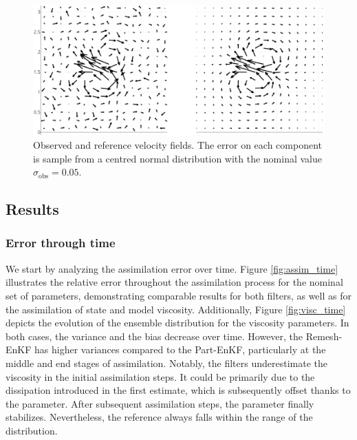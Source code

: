 \begin{figure}[htbp]
	\centering
	\includegraphics[width=0.8\linewidth]{images/app2d/velocity_ref_recadre.pdf}
	\caption{Observed and reference velocity fields. The error on each component is sample from a centred normal distribution with the nominal value $\sigma_{\text{obs}} = 0.05$.}
	\label{fig:velocity}
\end{figure}




\newpage

\subsection{Results}

\subsubsection{Error through time}


We start by analyzing the assimilation error over time. Figure \ref{fig:assim_time} illustrates the relative error throughout the assimilation process for the nominal set of parameters, demonstrating comparable results for both filters, as well as for the assimilation of state and model viscosity. Additionally, Figure \ref{fig:visc_time} depicts the evolution of the ensemble distribution for the viscosity parameters. In both cases, the variance and the bias decrease over time. However, the Remesh-EnKF has higher variances compared to the Part-EnKF, particularly at the middle and end stages of assimilation. Notably, the filters underestimate the viscosity in the initial assimilation steps. It could be primarily due to the dissipation introduced in the first estimate, which is subsequently offset thanks to the parameter. After subsequent assimilation steps, the parameter finally stabilizes. Nevertheless, the reference always falls within the range of the distribution.

